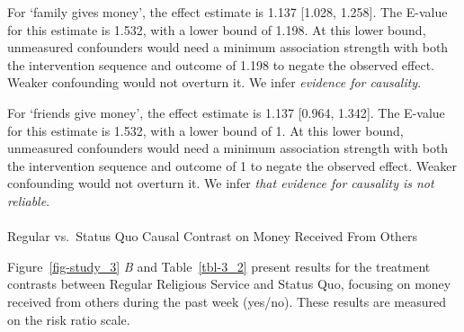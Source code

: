 \documentclass[
  single column]{article}
\makeatletter
\let\oldparagraph\paragraph
\renewcommand{\paragraph}{
    \@ifstar
      \xxxParagraphStar
      \xxxParagraphNoStar
  }
\newcommand{\xxxParagraphStar}[1]{\oldparagraph*{#1}\mbox{}}
\newcommand{\xxxParagraphNoStar}[1]{\oldparagraph{#1}\mbox{}}
\makeatother
\begin{document}
For `family gives money', the effect estimate is 1.137 {[}1.028,
1.258{]}. The E-value for this estimate is 1.532, with a lower bound of
1.198. At this lower bound, unmeasured confounders would need a minimum
association strength with both the intervention sequence and outcome of
1.198 to negate the observed effect. Weaker confounding would not
overturn it. We infer \emph{evidence for causality}.

For `friends give money', the effect estimate is 1.137 {[}0.964,
1.342{]}. The E-value for this estimate is 1.532, with a lower bound of
1. At this lower bound, unmeasured confounders would need a minimum
association strength with both the intervention sequence and outcome of
1 to negate the observed effect. Weaker confounding would not overturn
it. We infer \emph{that evidence for causality is not reliable}.

\paragraph{Regular vs.~Status Quo Causal Contrast on Money Received From
Others}\label{regular-vs.-status-quo-causal-contrast-on-money-received-from-others}

Figure~\ref{fig-study_3} \emph{B} and Table~\ref{tbl-3_2} present
results for the treatment contrasts between Regular Religious Service
and Status Quo, focusing on money received from others during the past
week (yes/no). These results are measured on the risk ratio scale.
\end{document}
